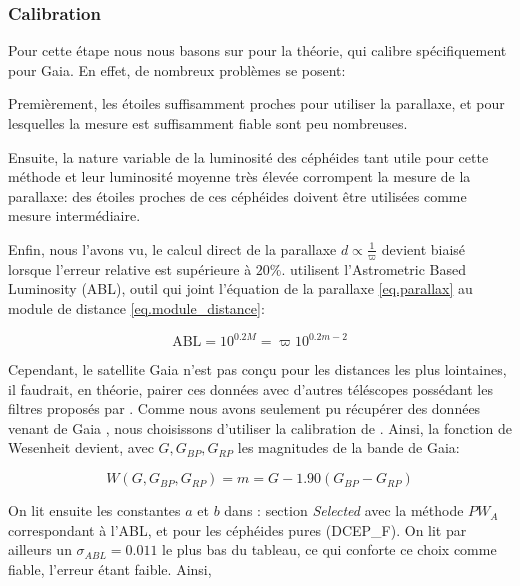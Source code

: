 \documentclass[12pt,a4paper,french]{scrartcl}
\begin{document}
\subsubsection{Calibration}
Pour cette étape nous nous basons sur \citet{cepheid-calibration} pour la théorie, qui calibre spécifiquement pour Gaia.
En effet, de nombreux problèmes se posent:

Premièrement, les étoiles suffisamment proches pour utiliser la parallaxe, et pour lesquelles la mesure est suffisamment fiable 
sont peu nombreuses.

Ensuite, la nature variable de la luminosité des céphéides tant utile pour cette méthode et leur luminosité moyenne très élevée
corrompent la mesure de la parallaxe: des étoiles proches de ces céphéides doivent être utilisées comme mesure intermédiaire. 

Enfin, nous l'avons vu, le calcul direct de la parallaxe $d\propto\frac{1}{\varpi}$ devient biaisé lorsque l'erreur relative est supérieure à $20\%$.
\citet{cepheid-calibration} utilisent l'Astrometric Based Luminosity (ABL), outil qui joint l'équation de la parallaxe \cref{eq.parallax} 
au module de distance \cref{eq.module_distance}:

\begin{equation}\label{eq.ABL}
    \text{ABL} = 10^{0.2 M} = \varpi 10^{0.2 m - 2}
\end{equation}

Cependant, le satellite Gaia n'est pas conçu pour les distances les plus lointaines, il faudrait, en théorie, %
pairer ces données avec d'autres téléscopes possédant les filtres proposés par \citet[Tableau~7]{cepheid-calibration}.
Comme nous avons seulement pu récupérer des données venant de Gaia \citep{cepheid_source}, 
nous choisissons d'utiliser la calibration de \citet[\'Equation~2]{Ripepi_datapaper}. 
Ainsi, la fonction de Wesenheit devient, avec $G,G_{BP},G_{RP}$ les magnitudes de la bande de Gaia:

\begin{equation}\label{eq.Wesenheit}
    W(G,G_{BP},G_{RP})=m=G-1.90(G_{BP}-G_{RP})
\end{equation}

On lit ensuite les constantes $a$ et $b$ dans \citet[Tableau~3]{Ripepi_datapaper}: 
section \textit{Selected} avec la méthode $PW_A$ correspondant à l'ABL, et pour les céphéides pures (DCEP\_F).
On lit par ailleurs un $\sigma_{ABL}=0.011$ le plus bas du tableau, ce qui conforte ce choix comme fiable, l'erreur étant faible.
Ainsi,
\end{document}
